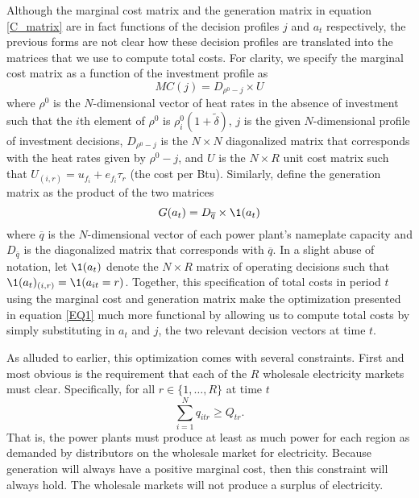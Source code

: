 Although the marginal cost matrix and the generation matrix in equation \eqref{C_matrix} are in fact functions of the decision profiles $j$ and $a_t$ respectively, the previous forms are not clear how these decision profiles are translated into the matrices that we use to compute total costs. For clarity, we specify the marginal cost matrix as a function of the investment profile as
\begin{equation}
    MC(j) = D_{\rho^0 - j} \times U
\end{equation}
where $\rho^0$ is the $N$-dimensional vector of heat rates in the absence of investment such that the $i$th element of $\rho^0$ is $\rho_i^0(1 + \tilde{\delta})$, $j$ is the given $N$-dimensional profile of investment decisions, $D_{\rho^0 - j}$ is the $N\times N$ diagonalized matrix that corresponds with the heat rates given by $\rho^0 - j$, and $U$ is the $N\times R$ unit cost matrix such that $U_{(i,r)} = u_{f_i} + e_{f_i}\tau_r$ (the cost per Btu). Similarly, define the generation matrix as the product of the two matrices
\begin{equation}
    G(a_t) = D_{\overline{q}} \times \1(a_t)
\end{equation}
where $\overline{q}$ is the $N$-dimensional vector of each power plant's nameplate capacity and $D_{\overline{q}}$ is the diagonalized matrix that corresponds with $\overline{q}$. In a slight abuse of notation, let $\1(a_t)$ denote the $N\times R$ matrix of operating decisions such that $\1(a_t)_{(i,r)} = \1(a_{it} = r)$. Together, this specification of total costs in period $t$ using the marginal cost and generation matrix make the optimization presented in equation \eqref{EQ1} much more functional by allowing us to compute total costs by simply substituting in $a_t$ and $j$, the two relevant decision vectors at time $t$. 

As alluded to earlier, this optimization comes with several constraints. First and most obvious is the requirement that each of the $R$ wholesale electricity markets must clear. Specifically, for all $r \in \{1, \ldots, R\}$ at time $t$
\begin{equation}
    \sum_{i =1}^N q_{itr} \geq Q_{tr}. 
\end{equation}
That is, the power plants must produce at least as much power for each region as demanded by distributors on the wholesale market for electricity. Because generation will always have a positive marginal cost, then this constraint will always hold. The wholesale markets will not produce a surplus of electricity.

